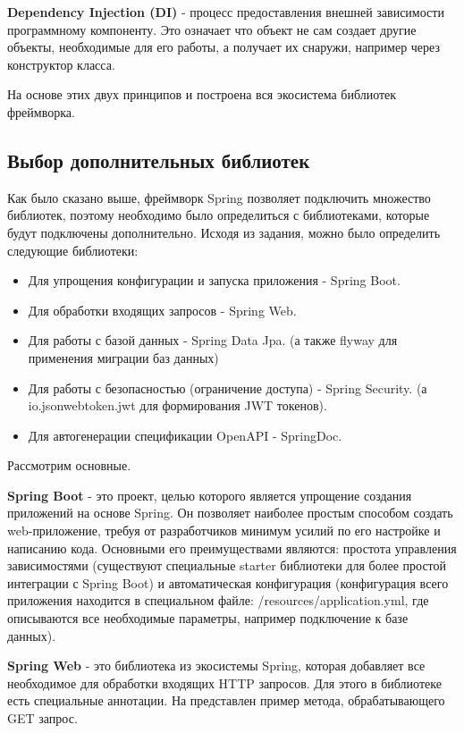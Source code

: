 \textbf{Dependency Injection (DI)} -  процесс предоставления внешней зависимости программному компоненту. Это означает что объект не сам создает другие объекты, необходимые для его работы, а получает их снаружи, например через конструктор класса.

На основе этих двух принципов и построена вся экосистема библиотек фреймворка. 

\subsection{Выбор дополнительных библиотек} \label{ch2:subsec13}

Как было сказано выше, фреймворк Spring позволяет подключить множество библиотек, поэтому необходимо было определиться с библиотеками, которые будут подключены дополнительно. Исходя из задания, можно было определить следующие библиотеки:

\begin{itemize}
	\item Для упрощения конфигурации и запуска приложения - Spring Boot.
	\item Для обработки входящих запросов - Spring Web.
	\item Для работы с базой данных - Spring Data Jpa. (а также flyway для применения миграции баз данных)
	\item Для работы с безопасностью (ограничение доступа) - Spring Security. (а io.jsonwebtoken.jwt для формирования JWT токенов).
	\item Для автогенерации спецификации OpenAPI - SpringDoc.
\end{itemize}  

Рассмотрим основные.

\textbf{Spring Boot} - это проект, целью которого является упрощение создания приложений на основе Spring. Он позволяет наиболее простым способом создать web-приложение, требуя от разработчиков минимум усилий по его настройке и написанию кода. Основными его преимуществами являются: простота управления зависимостями (существуют специальные starter библиотеки для более простой интеграции с Spring Boot) и автоматическая конфигурация (конфигурация всего приложения находится в специальном файле: /resources/application.yml, где описываются все необходимые параметры, например подключение к базе данных).

\textbf{Spring Web} - это библиотека из экосистемы Spring, которая добавляет все необходимое для обработки входящих HTTP запросов. Для этого в библиотеке есть специальные аннотации. На  представлен пример метода, обрабатывающего GET запрос. 

